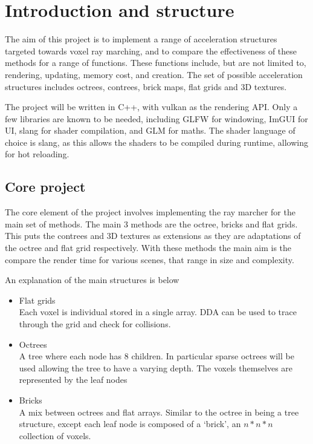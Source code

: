 \section*{Introduction and structure}

The aim of this project is to implement a range of acceleration
structures targeted towards voxel ray marching, and to compare the
effectiveness of these methods for a range of functions.
These functions include, but are not limited to, rendering, updating,
memory cost, and creation.
The set of possible acceleration structures includes octrees,
contrees, brick maps, flat grids and 3D textures.

The project will be written in C++, with vulkan as the rendering API.
Only a few libraries are known to be needed, including GLFW for windowing,
ImGUI for UI, slang for shader compilation, and GLM for maths. The
shader language of choice is slang, as this allows the shaders to be compiled
during runtime, allowing for hot reloading.

\subsection*{Core project}
The core element of the project involves implementing the ray marcher
for the main set of methods. The main 3 methods are the octree, bricks
and flat grids. This puts the contrees and 3D textures as extensions
as they are adaptations of
the octree and flat grid respectively. With these methods the main
aim is the compare the render time for various scenes, that range in
size and complexity.

An explanation of the main structures is below

\begin{itemize}
  \item Flat grids \\
    Each voxel is individual stored in a single array. DDA can be used to
    trace through the grid and check for collisions.
  \item Octrees \\
    A tree where each node has 8 children. In particular sparse octrees will be
    used allowing the tree to have a varying depth. The voxels themselves are
    represented by the leaf nodes
  \item Bricks \\
    A mix between octrees and flat arrays. Similar to the octree in
    being a tree structure,
    except each leaf node is composed of a `brick', an
    $n*n*n$ collection of voxels.
\end{itemize}

